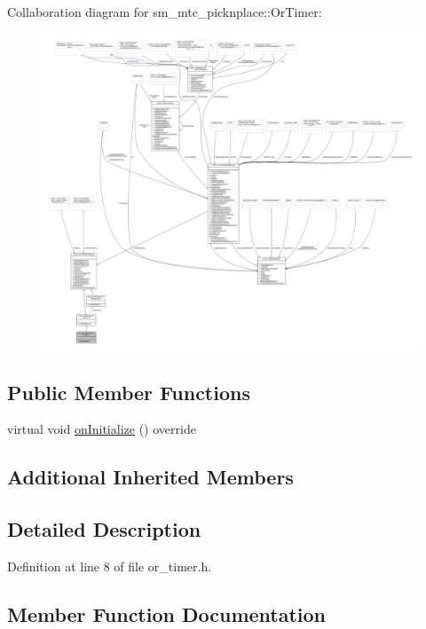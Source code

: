 Collaboration diagram for sm\+\_\+mtc\+\_\+picknplace\+:\+:Or\+Timer\+:
\nopagebreak
\begin{figure}[H]
\begin{center}
\leavevmode
\includegraphics[width=350pt]{classsm__mtc__picknplace_1_1OrTimer__coll__graph}
\end{center}
\end{figure}
\subsection*{Public Member Functions}
\begin{DoxyCompactItemize}
\item 
virtual void \hyperlink{classsm__mtc__picknplace_1_1OrTimer_a8f75096ca8eb675ed1b169fb5401f356}{on\+Initialize} () override
\end{DoxyCompactItemize}
\subsection*{Additional Inherited Members}


\subsection{Detailed Description}


Definition at line 8 of file or\+\_\+timer.\+h.



\subsection{Member Function Documentation}
